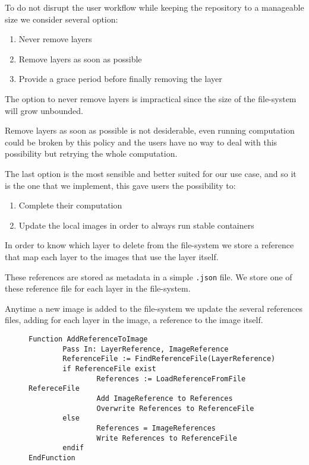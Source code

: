 To do not disrupt the user workflow while keeping the repository to a manageable
size we consider several option: 
\begin{enumerate}
\item Never remove layers
\item Remove layers as soon as possible
\item Provide a grace period before finally removing the layer
\end{enumerate}

The option to never remove layers is impractical since the size of the
file-system will grow unbounded.

Remove layers as soon as possible is not desiderable, even running computation
could be broken by this policy and the users have no way to deal with this
possibility but retrying the whole computation.

The last option is the most sensible and better suited for our use case, and so
it is the one that we implement, this gave users the possibility to:
\begin{enumerate}
\item Complete their computation
\item Update the local images in order to always run stable containers
\end{enumerate}

In order to know which layer to delete from the file-system we store a reference
that map each layer to the images that use the layer itself.

These references are stored as metadata in a simple \texttt{.json} file.  We
store one of these reference file for each layer in the file-system.

Anytime a new image is added to the file-system we update the several
references files, adding for each layer in the image, a reference to the image
itself.

\begin{figure}
\begin{lstlisting}[caption={Algorithm to add an image reference to the layer metadata}, label={lst:add-image-reference-to-layer}]
Function AddReferenceToImage
        Pass In: LayerReference, ImageReference
        ReferenceFile := FindReferenceFile(LayerReference)
        if ReferenceFile exist
                References := LoadReferenceFromFile RefereceFile
                Add ImageReference to References
                Overwrite References to ReferenceFile
        else 
                References = ImageReferences
                Write References to ReferenceFile
        endif
EndFunction
\end{lstlisting}
\end{figure}

